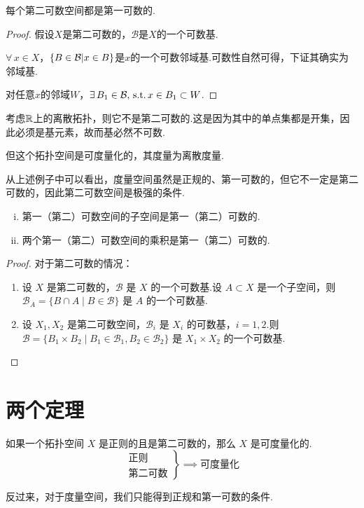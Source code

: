 \begin{proposition}[][prop:5.2]
    每个第二可数空间都是第一可数的.
\end{proposition}
\begin{proof}
    假设$X$是第二可数的，$\mathcal{B}$是$X$的一个可数基.\par
    $\forall\, x\in X$，$\{B\in\mathcal{B}|x\in B\}$是$x$的一个可数邻域基.可数性自然可得，下证其确实为邻域基.\par
    对任意$x$的邻域$W$，$\exists\, B_1\in\mathcal{B},\operatorname{\,\text{s.t.}} x\in B_1\subset W$.
\end{proof}

\begin{instance}
    考虑$\mathbb{R}$上的离散拓扑，则它不是第二可数的.这是因为其中的单点集都是开集，因此必须是基元素，故而基必然不可数.\par
    但这个拓扑空间是可度量化的，其度量为离散度量.\par
\end{instance}
从上述例子中可以看出，度量空间虽然是正规的、第一可数的，但它不一定是第二可数的，因此第二可数空间是极强的条件.\par

\begin{proposition}[][prop:5.3]
    \begin{enumerate}[(i)]
        \item 第一（第二）可数空间的子空间是第一（第二）可数的.
        \item 两个第一（第二）可数空间的乘积是第一（第二）可数的.
    \end{enumerate}
\end{proposition}
\begin{proof}
    对于第二可数的情况：
    \begin{enumerate}
        \item[(i)] 设 $X$ 是第二可数的，$\mathcal{B}$ 是 $X$ 的一个可数基.设 $A \subset X$ 是一个子空间，则 $\mathcal{B}_A = \{B \cap A \mid B \in \mathcal{B}\}$ 是 $A$ 的一个可数基.
        \item[(ii)] 设 $X_1, X_2$ 是第二可数空间，$\mathcal{B}_i$ 是 $X_i$ 的可数基，$i=1,2$.则 $\mathcal{B} = \{B_1 \times B_2 \mid B_1 \in \mathcal{B}_1, B_2 \in \mathcal{B}_2\}$ 是 $X_1 \times X_2$ 的一个可数基.
    \end{enumerate}
\end{proof}

\section{两个定理}
\begin{theorem}[Urysohn度量化定理][thm:5.1]
    如果一个拓扑空间 $X$ 是正则的且是第二可数的，那么 $X$ 是可度量化的.
    \[
        \left.
        \begin{array}{r}
            \text{正则} \\
            \text{第二可数}
        \end{array}
        \right\} \implies \text{可度量化}
    \]
\end{theorem}
反过来，对于度量空间，我们只能得到正规和第一可数的条件.

